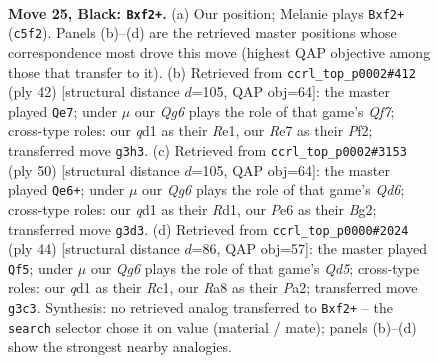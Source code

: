 \documentclass[11pt]{article}
\begin{document}
\clearpage

\begin{figure}[p]\centering
\begin{subfigure}{0.46\textwidth}\centering
\resizebox{\linewidth}{!}{%
\newchessgame
\chessboard[
  setfen={r5k1/pp2r2p/R3p1p1/2b5/6PP/1N4q1/1P3PB1/2BQ1RK1 b - - 6 25},
  showmover=false,
  pgfstyle=straightmove, color=movearrow, markmove={c5-f2}
]}
\caption{}
\end{subfigure}\hfill
\begin{subfigure}{0.46\textwidth}\centering
\resizebox{\linewidth}{!}{%
\newchessgame
\chessboard[
  setfen={1k1r1r2/ppqb1Q2/1n2p2p/4P3/1pPN3P/3B4/P4PP1/R3R1K1 w - - 3 22},
  showmover=false,
  pgfstyle=straightmove, color=movearrow, markmove={f7-e7}
]}
\caption{}
\end{subfigure}
\\[4pt]
\begin{subfigure}{0.46\textwidth}\centering
\resizebox{\linewidth}{!}{%
\newchessgame
\chessboard[
  setfen={4k1r1/2qr4/p1bQ1b1p/2p1n3/1p2P1P1/1P2B2P/P1P3B1/1K1R4 w - - 0 26},
  showmover=false,
  pgfstyle=straightmove, color=movearrow, markmove={d6-e6}
]}
\caption{}
\end{subfigure}\hfill
\begin{subfigure}{0.46\textwidth}\centering
\resizebox{\linewidth}{!}{%
\newchessgame
\chessboard[
  setfen={r5k1/5pp1/p1b3q1/2pQ3p/4r2P/2B1PRP1/PP4P1/2R3K1 w - - 1 23},
  showmover=false,
  pgfstyle=straightmove, color=movearrow, markmove={d5-f5}
]}
\caption{}
\end{subfigure}
\caption{\textbf{Move 25, Black: \texttt{Bxf2+}.} (a) Our position; Melanie plays \texttt{Bxf2+} (\texttt{c5f2}). Panels (b)--(d) are the retrieved master positions whose correspondence most drove this move (highest QAP objective among those that transfer to it). (b) Retrieved from \texttt{ccrl\_top\_p0002\#412} (ply 42) [structural distance $d$=105, QAP obj=64]: the master played \texttt{Qe7}; under $\mu$ our \emph{Qg6} plays the role of that game's \emph{Qf7}; cross-type roles: our \emph{q}d1 as their \emph{R}e1, our \emph{R}e7 as their \emph{P}f2; transferred move \texttt{g3h3}. (c) Retrieved from \texttt{ccrl\_top\_p0002\#3153} (ply 50) [structural distance $d$=105, QAP obj=64]: the master played \texttt{Qe6+}; under $\mu$ our \emph{Qg6} plays the role of that game's \emph{Qd6}; cross-type roles: our \emph{q}d1 as their \emph{R}d1, our \emph{P}e6 as their \emph{B}g2; transferred move \texttt{g3d3}. (d) Retrieved from \texttt{ccrl\_top\_p0000\#2024} (ply 44) [structural distance $d$=86, QAP obj=57]: the master played \texttt{Qf5}; under $\mu$ our \emph{Qg6} plays the role of that game's \emph{Qd5}; cross-type roles: our \emph{q}d1 as their \emph{R}c1, our \emph{R}a8 as their \emph{P}a2; transferred move \texttt{g3c3}. Synthesis: no retrieved analog transferred to \texttt{Bxf2+} -- the \texttt{search} selector chose it on value (material / mate); panels (b)--(d) show the strongest nearby analogies.}
\label{fig:thought-m49}
\end{figure}
\end{document}
